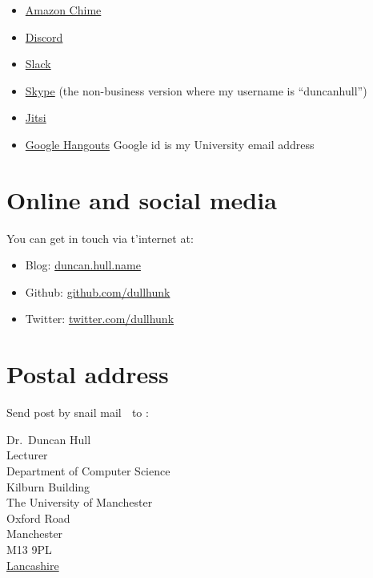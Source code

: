 \documentclass[
  12pt,
]{book}
\providecommand{\tightlist}{%
  \setlength{\itemsep}{0pt}\setlength{\parskip}{0pt}}
\begin{document}
\begin{itemize}
\tightlist
\item
  \href{https://aws.amazon.com/chime/}{Amazon Chime}
\item
  \href{https://en.wikipedia.org/wiki/Discord_(software)}{Discord}
\item
  \href{https://en.wikipedia.org/wiki/Slack_(software)}{Slack}
\item
  \href{https://en.wikipedia.org/wiki/Skype}{Skype} (the non-business version where my username is ``duncanhull'')
\item
  \href{https://en.wikipedia.org/wiki/Jitsi}{Jitsi}
\item
  \href{https://en.wikipedia.org/wiki/Google_Hangouts}{Google Hangouts} Google id is my University email address
\end{itemize}

\hypertarget{online-and-social-media}{%
\section{Online and social media}\label{online-and-social-media}}

You can get in touch via t'internet at:

\begin{itemize}
\tightlist
\item
  Blog: \href{https://duncan.hull.name}{duncan.hull.name}
\item
  Github: \href{https://github.com/dullhunk}{github.com/dullhunk}
\item
  Twitter: \href{https://twitter.com/dullhunk}{twitter.com/dullhunk}
\end{itemize}

\hypertarget{postal-address}{%
\section{Postal address}\label{postal-address}}

Send post by snail mail 🐌 to :

Dr.~Duncan Hull\\
Lecturer\\
Department of Computer Science\\
Kilburn Building\\
The University of Manchester\\
Oxford Road\\
Manchester\\
M13 9PL\\
\href{https://duncan.hull.name/2019/07/05/mancashire/}{Lancashire} 🌹
\end{document}
